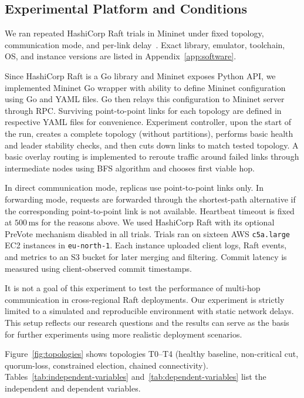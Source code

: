 \documentclass[11pt,a4paper]{article}
\begin{document}
\subsection{Experimental Platform and Conditions}

We ran repeated HashiCorp Raft trials in Mininet under fixed topology, communication mode, and per-link delay~\cite{hashicorp_raft,lantz2010mininet,mininet230}.
Exact library, emulator, toolchain, OS, and instance versions are listed in Appendix~\ref{app:software}.

Since HashiCorp Raft is a Go library and Mininet exposes Python API, we implemented Mininet Go wrapper with ability to define Mininet configuration using Go and YAML files.
Go then relays this configuration to Mininet server through RPC.
Surviving point-to-point links for each topology are defined in respective YAML files for convenience.
Experiment controller, upon the start of the run, creates a complete topology (without partitions), performs basic health and leader stability checks, and then cuts down links to match tested topology.
A basic overlay routing is implemented to reroute traffic around failed links through intermediate nodes using BFS algorithm and chooses first viable hop.

In direct communication mode, replicas use point-to-point links only.
In forwarding mode, requests are forwarded through the shortest-path alternative if the corresponding point-to-point link is not available.
Heartbeat timeout is fixed at \(500\,\mathrm{ms}\) for the reasons above.
We used HashiCorp Raft with its optional PreVote mechanism disabled in all trials.
Trials ran on sixteen AWS \texttt{c5a.large} EC2 instances in \texttt{eu-north-1}.
Each instance uploaded client logs, Raft events, and metrics to an S3 bucket for later merging and filtering.
Commit latency is measured using client-observed commit timestamps.

It is not a goal of this experiment to test the performance of multi-hop communication in cross-regional Raft deployments. 
Our experiment is strictly limited to a simulated and reproducible environment with static network delays.
This setup reflects our research questions and the results can serve as the basis for further experiments using more realistic deployment scenarios.

Figure~\ref{fig:topologies} shows topologies T0--T4 (healthy baseline, non-critical cut, quorum-loss, constrained election, chained connectivity).
Tables~\ref{tab:independent-variables} and~\ref{tab:dependent-variables} list the independent and dependent variables.
\end{document}
